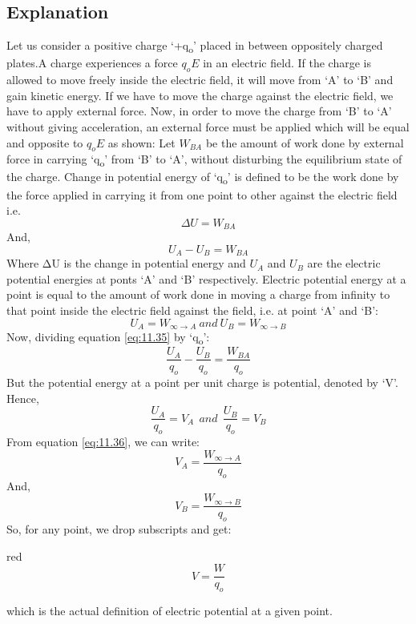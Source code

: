 \subsection*{Explanation}
Let us consider a positive charge ‘+q\textsubscript{o}’ placed in between
oppositely charged plates.A charge experiences a force $q_{o}E$ in an
electric field. If the charge is allowed to move freely inside the electric field,
it will move from ‘A’ to ‘B’ and gain kinetic energy. If we have to move the
charge against the electric field, we have to apply external force. Now,
in order to move the charge from ‘B’ to ‘A’ without giving acceleration,
an external force must be applied which will be equal and opposite to $q_{o}E$
as shown:
Let $W_{BA}$ be the amount of work done by external force in carrying ‘q\textsubscript{o}’
from ‘B’ to ‘A’, without disturbing the equilibrium state of the charge.
Change in potential energy of ‘q\textsubscript{o}’ is defined to be the work
done by the force applied in carrying it from one point to other against the
electric field i.e.
\begin{equation}
  \Delta U = W_{BA} \nonumber
\end{equation}
And,
\begin{equation}\label{eq:11.35}
   U_{A} - U_{B} = W_{BA} 
\end{equation}
Where ΔU is the change in potential energy and $U_{A}$ and $U_{B}$ are the
electric potential energies at ponts ‘A’ and ‘B’ respectively. Electric potential
energy at a point is equal to the amount of work done in moving a charge from
infinity to that point inside the electric field against the field, i.e.
at point ‘A’ and ‘B’:
\begin{equation}\label{eq:11.36}
  U_{A} = W_{\infty\rightarrow A}\:and\:U_{B} = W_{\infty\rightarrow B}
\end{equation}
Now, dividing equation \ref{eq:11.35} by ‘q\textsubscript{o}’:
\begin{equation}\label{eq:11.37}
  \frac{U_{A}}{q_{o}} - \frac{U_{B}}{q_{o}} = \frac{W_{BA}}{q_{o}}
\end{equation}
But the potential energy at a point per unit charge is potential, denoted by ‘V’. Hence,
\begin{equation}\label{eq:11.38}
  \frac{U_{A}}{q_{o}} = V_{A} \:\: and \:\: \frac{U_{B}}{q_{o}} = V_{B} 
\end{equation}
From equation \ref{eq:11.36}, we can write:
\begin{equation}\label{eq:11.37}
  V_{A} =\frac{W_{\infty\rightarrow A}}{q_{o}}
\end{equation}
And,
\begin{equation}\label{eq:11.40}
  V_{B} = \frac{W_{\infty\rightarrow B}}{q_{o}}
\end{equation}
So, for any point, we drop subscripts and get:
\begin{mybox}{red}{}
\begin{equation}\label{eq:11.41}
  V = \frac{W}{q_{o}}
\end{equation}
\end{mybox}
which is the actual  definition of electric potential at a given point.

